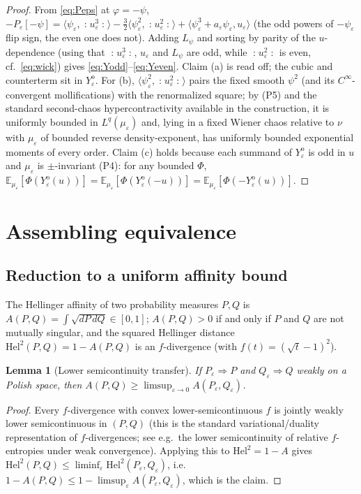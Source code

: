 \documentclass[12pt]{article}
\newcommand{\bE}{\mathbb{E}}
\newcommand{\eps}{\varepsilon}
\newcommand{\Wick}[1]{\mathopen{:}#1\mathclose{:}}
\theoremstyle{plain}
\newtheorem{lemma}{Lemma}
\theoremstyle{definition}
\begin{document}
\begin{proof}
From \eqref{eq:Peps} at $\varphi=-\psi$,
$-P_\eps[-\psi]=\langle\psi_\eps,\Wick{u_\eps^3}\rangle-\tfrac32\langle\psi_\eps^2,\Wick{u_\eps^2}\rangle
+\langle\psi_\eps^3+a_\eps\psi_\eps,u_\eps\rangle$ (the odd powers of $-\psi_\eps$
flip sign, the even one does not). Adding $L_\psi$ and sorting by parity of the
$u$-dependence (using that $\Wick{u_\eps^3}$, $u_\eps$ and $L_\psi$ are odd, while
$\Wick{u_\eps^2}$ is even, cf.\ \eqref{eq:wick}) gives \eqref{eq:Yodd}--\eqref{eq:Yeven}.
Claim (a) is read off; the cubic and counterterm sit in $Y^{\mathrm{o}}_\eps$. For
(b), $\langle\psi_\eps^2,\Wick{u_\eps^2}\rangle$ pairs the fixed smooth $\psi^2$ (and
its $C^\infty$-convergent mollifications) with the renormalized square; by (P5) and
the standard second-chaos hypercontractivity available in the construction, it is
uniformly bounded in $L^q(\mu_\eps)$ and, lying in a fixed Wiener chaos relative to
$\nu$ with $\mu_\eps$ of bounded reverse density-exponent, has uniformly bounded
exponential moments of every order. Claim (c) holds because each summand of
$Y^{\mathrm{o}}_\eps$ is odd in $u$ and $\mu_\eps$ is $\pm$-invariant (P4): for any
bounded $\Phi$, $\bE_{\mu_\eps}[\Phi(Y^{\mathrm{o}}_\eps(u))]=\bE_{\mu_\eps}[\Phi(Y^{\mathrm{o}}_\eps(-u))]
=\bE_{\mu_\eps}[\Phi(-Y^{\mathrm{o}}_\eps(u))]$.
\end{proof}

\section{Assembling equivalence}\label{sec:assemble}

\subsection{Reduction to a uniform affinity bound}
The Hellinger affinity of two probability measures $P,Q$ is
$A(P,Q)=\int\sqrt{dP\,dQ}\in[0,1]$; $A(P,Q)>0$ if and only if $P$ and $Q$ are not
mutually singular, and the squared Hellinger distance $\mathrm{Hel}^2(P,Q)=1-A(P,Q)$
is an $f$-divergence (with $f(t)=(\sqrt t-1)^2$).

\begin{lemma}[Lower semicontinuity transfer]\label{lem:lsc}
If $P_\eps\Rightarrow P$ and $Q_\eps\Rightarrow Q$ weakly on a Polish space, then
$A(P,Q)\ge\limsup_{\eps\to0}A(P_\eps,Q_\eps)$.
\end{lemma}

\begin{proof}
Every $f$-divergence with convex lower-semicontinuous $f$ is jointly weakly
lower semicontinuous in $(P,Q)$ (this is the standard variational/duality
representation of $f$-divergences; see e.g.\ the lower semicontinuity of relative
$f$-entropies under weak convergence). Applying this to $\mathrm{Hel}^2=1-A$ gives
$\mathrm{Hel}^2(P,Q)\le\liminf_\eps\mathrm{Hel}^2(P_\eps,Q_\eps)$, i.e.\
$1-A(P,Q)\le 1-\limsup_\eps A(P_\eps,Q_\eps)$, which is the claim.
\end{proof}
\end{document}
